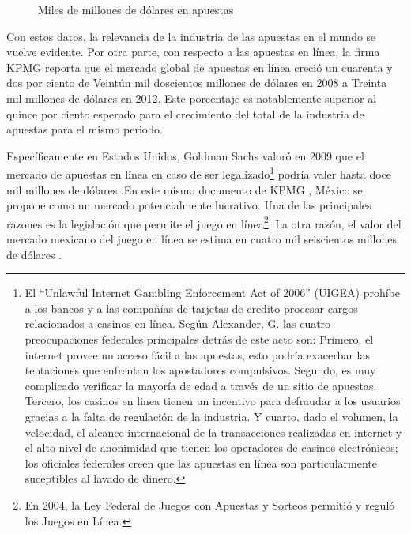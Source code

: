 \begin{figure}[!htb]\centering
   \begin {minipage}{0.85\textwidth}
     \caption{Miles de millones de dólares en apuestas}\label{Fig:gasto-apuestas}
   \end{minipage}
\end{figure}

Con estos datos, la relevancia de la industria de las apuestas en el mundo se vuelve evidente.  Por otra parte, con respecto a las apuestas en línea, la firma KPMG \cite{kpmgOnlineGaming} reporta que el mercado global de apuestas en línea creció un cuarenta y dos por ciento de Veintún mil doscientos millones de dólares en 2008 a Treinta mil millones de dólares en 2012. Este porcentaje es notablemente superior al quince por ciento esperado para el crecimiento del total de la industria de apuestas para el mismo periodo. 

Específicamente en Estados Unidos, Goldman Sachs valoró en 2009 que el mercado de apuestas en línea en caso de ser legalizado\footnote{El ``Unlawful Internet Gambling Enforcement Act of 2006'' (UIGEA)  prohíbe a los bancos y a las compañías de tarjetas de credito procesar cargos relacionados a casinos en línea. Según Alexander, G. \cite{alexander2008us} las cuatro preocupaciones federales principales detrás de este acto son: Primero, el internet provee un acceso fácil a las apuestas, esto podría exacerbar las tentaciones que enfrentan los apostadores compulsivos. Segundo, es muy complicado verificar la mayoría de edad a través de un sitio de apuestas. Tercero, los casinos en linea tienen un incentivo para defraudar a los usuarios gracias a la falta de regulación de la industria. Y cuarto, dado el volumen, la velocidad, el alcance internacional de la transacciones realizadas en internet y el alto nivel de anonimidad que tienen los operadores de casinos electrónicos; los oficiales federales creen que las apuestas en línea son particularmente suceptibles al lavado de dinero.} podría valer hasta doce mil millones de dólares \cite{goldmanParty}.En este mismo documento de KPMG \cite{kpmgOnlineGaming}, México se propone como un mercado potencialmente lucrativo. Una de las principales razones es la legislación que permite el juego en línea\footnote{En 2004, la Ley Federal de Juegos con Apuestas y Sorteos permitió y reguló los Juegos en Línea.}. La otra razón, el valor del mercado mexicano del juego en línea se estima en cuatro mil seiscientos millones de dólares \cite{yogonet}.

